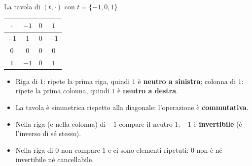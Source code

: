 \begin{esempio}{La tavola di $(t, \cdot)$ con $t = \{-1, 0, 1\}$}
    \begin{center}
    \renewcommand{\arraystretch}{1.3}
    \begin{tabular}{c|ccc}
        $\cdot$ & $-1$ & $0$ & $1$ \\ \hline
        $-1$ & \cellcolor{pink!45}$1$ & $0$ & \cellcolor{azure-gradient-2}$-1$ \\
        $0$  & $0$ & \cellcolor{pink!45}$0$ & \cellcolor{azure-gradient-2}$0$ \\
        $1$  & \cellcolor{green-gradient-3}$-1$ & \cellcolor{green-gradient-3}$0$ & \cellcolor{pink!45}$1$ \\
    \end{tabular}
    \end{center}
    \begin{itemize}
        \item \colorbox{green-gradient-3}{Riga di $1$}: ripete la prima riga, quindi $1$ è \textbf{neutro a sinistra};
              \colorbox{azure-gradient-2}{colonna di $1$}: ripete la prima colonna, quindi $1$ è \textbf{neutro a destra}.
        \item La tavola è simmetrica rispetto alla \colorbox{pink!45}{diagonale}: l'operazione è \textbf{commutativa}.
        \item Nella riga (e nella colonna) di $-1$ compare il neutro $1$: $-1$ è \textbf{invertibile} (è l'inverso di sé stesso).
        \item Nella riga di $0$ non compare $1$ e ci sono elementi ripetuti: $0$ non è né invertibile né cancellabile.
    \end{itemize}
\end{esempio}

